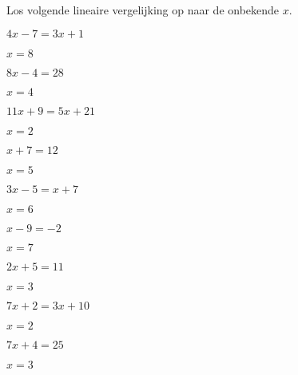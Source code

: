 \documentclass{ximera}
\begin{document}
\begin{exercise} Los volgende lineaire vergelijking op naar de onbekende \(x\).
\begin{xmmulticols}
  
  
  \begin{question} \( 4x - 7  =  3x + 1     \) \begin{uitkomst} \( x  = 8  \) \end{uitkomst} \end{question}
  \begin{question} \( 8x - 4  =  28         \) \begin{uitkomst} \( x  = 4  \) \end{uitkomst} \end{question}
  \begin{question} \( 11x + 9 =  5x + 21    \) \begin{uitkomst} \( x  = 2  \) \end{uitkomst} \end{question}
  \begin{question} \( x + 7   =  12         \) \begin{uitkomst} \( x  = 5  \) \end{uitkomst} \end{question}
  \begin{question} \( 3x - 5  =  x + 7      \) \begin{uitkomst} \( x  = 6  \) \end{uitkomst} \end{question}
  \begin{question} \( x - 9   =  -2         \) \begin{uitkomst} \( x  = 7  \) \end{uitkomst} \end{question}
  \begin{question} \( 2x + 5  =  11         \) \begin{uitkomst} \( x  = 3  \) \end{uitkomst} \end{question}
  \begin{question} \( 7x + 2  =  3x + 10    \) \begin{uitkomst} \( x  = 2  \) \end{uitkomst} \end{question}
  \begin{question} \( 7x + 4  =  25         \) \begin{uitkomst} \( x  = 3  \) \end{uitkomst} \end{question}

\end{xmmulticols}
\end{exercise}
\end{document}
